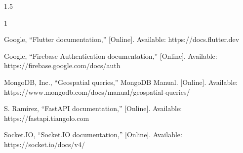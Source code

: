 \documentclass[A4paper,12pt]{report}
\theoremstyle{plain}
\theoremstyle{definition}
\theoremstyle{remark}
\numberwithin{equation}{section}
\renewenvironment{thebibliography}[1]{
  \begin{oldthebibliography}{#1}
    \setlength{\itemsep}{0em}
}
{
  \end{oldthebibliography}
}
\begin{document}
\begin{spacing}{1.5}
\begin{thebibliography}{1}
 Google, ``Flutter documentation,'' [Online]. Available: https://docs.flutter.dev

 Google, ``Firebase Authentication documentation,'' [Online]. Available: https://firebase.google.com/docs/auth

 MongoDB, Inc., ``Geospatial queries,'' MongoDB Manual. [Online]. Available: https://www.mongodb.com/docs/manual/geospatial-queries/

 S. Ramírez, ``FastAPI documentation,'' [Online]. Available: https://fastapi.tiangolo.com

 Socket.IO, ``Socket.IO documentation,'' [Online]. Available: https://socket.io/docs/v4/

\end{thebibliography}
\end{spacing}
\end{document}
